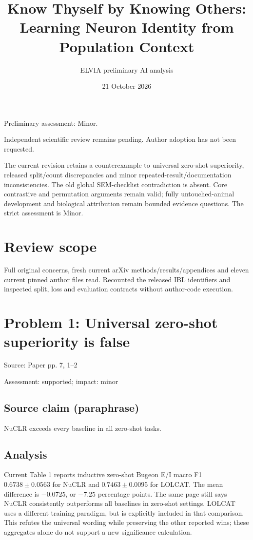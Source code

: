 \documentclass[11pt]{article}
\begin{document}
\title{Know Thyself by Knowing Others: Learning Neuron Identity from Population Context}

\author{ELVIA preliminary AI analysis}\date{21 October 2026}\maketitle

Preliminary assessment: Minor.\par

Independent scientific review remains pending. Author adoption has not been requested.

The current revision retains a counterexample to universal zero-shot superiority, released split/count discrepancies and minor repeated-result/documentation inconsistencies. The old global SEM-checklist contradiction is absent. Core contrastive and permutation arguments remain valid; fully untouched-animal development and biological attribution remain bounded evidence questions. The strict assessment is Minor.

\section*{Review scope}

Full original concerns, fresh current arXiv methods/results/appendices and eleven current pinned author files read. Recounted the released IBL identifiers and inspected split, loss and evaluation contracts without author-code execution.

\section*{Problem 1: Universal zero-shot superiority is false}

Source: Paper pp. 7, 1–2

Assessment: supported; impact: minor

\subsection*{Source claim (paraphrase)}

NuCLR exceeds every baseline in all zero-shot tasks.

\subsection*{Analysis}

Current Table 1 reports inductive zero-shot Bugeon E/I macro F1 \(0.6738\pm0.0563\) for NuCLR and \(0.7463\pm0.0095\) for LOLCAT. The mean difference is \(-0.0725\), or \(-7.25\) percentage points. The same page still says NuCLR consistently outperforms all baselines in zero-shot settings. LOLCAT uses a different training paradigm, but is explicitly included in that comparison. This refutes the universal wording while preserving the other reported wins; these aggregates alone do not support a new significance calculation.
\end{document}
